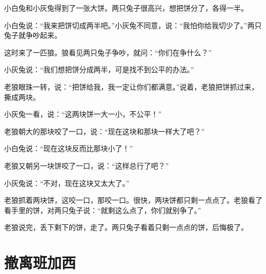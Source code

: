 \documentclass[12pt,UTF-8,openany]{ctexbook}
\begin{document}
\begin{large}
    
    小白兔和小灰兔得到了一张大饼。两只兔子很高兴，想把饼分了，各得一半。
    
    小白兔说：“我来把饼切成两半吧。”小灰兔不同意，说：“我怕你给我切少了。”两只兔子就争吵起来。
    
    这时来了一匹狼。狼看见两只兔子争吵，就问：“你们在争什么？”
    
    小灰兔说：“我们想把饼分成两半，可是找不到公平的办法。”
    
    老狼眼珠一转，说：“把饼给我，我一定让你们都满意。”说着，老狼把饼抓过来，撕成两块。
    
    小灰兔一看，说：“这两块饼一大一小，不公平！”
    
    老狼朝大的那块咬了一口，说：“现在这块和那块一样大了吧？”
    
    小白兔说：“现在这块反而比那块小了！”
    
    老狼又朝另一块饼咬了一口，说：“这样总行了吧？”
    
    小灰兔说：“不对，现在这块又太大了。”
    
    老狼抓着两块饼，这咬一口，那咬一口。很快，两块饼都只剩一点点了。老狼看了看手里的饼，对两只兔子说：“就剩这么点了，你们就别争了。”
    
    老狼说完，丢下剩下的饼，走了。两只兔子看着只剩一点点的饼，后悔极了。
    
\end{large}



\chapter{撤离班加西}
\end{document}
